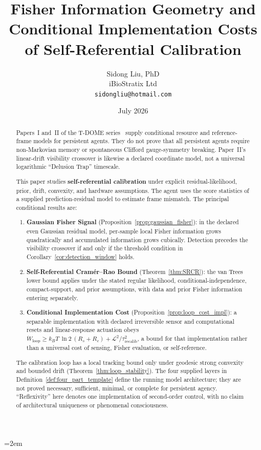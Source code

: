 \documentclass[12pt]{article}
\title{Fisher Information Geometry and Conditional Implementation Costs\\
of Self-Referential Calibration}
\author{Sidong Liu, PhD \\
\small iBioStratix Ltd \\
\small \texttt{sidongliu@hotmail.com}}
\date{July 2026}
\begin{document}
\emergencystretch=2em
\raggedbottom
{}
\maketitle

\begin{abstract}
Papers~I and~II of the T-DOME
series~\cite{Liu2026TDOME_I,Liu2026TDOME_II} supply conditional
resource and reference-frame models for persistent agents.  They do not
prove that all persistent agents require non-Markovian memory or
spontaneous Clifford gauge-symmetry breaking.  Paper~II's linear-drift
visibility crossover is likewise a declared coordinate model, not a
universal logarithmic ``Delusion Trap'' timescale.

This paper studies \textbf{self-referential calibration} under explicit
residual-likelihood, prior, drift, convexity, and hardware assumptions.
The agent uses the score statistics of a supplied prediction-residual
model to estimate frame mismatch.  The principal conditional results are:
\begin{enumerate}
\item \textbf{Gaussian Fisher Signal}
  (Proposition~\ref{prop:gaussian_fisher}):
  in the declared even Gaussian residual model, per-sample local Fisher
  information grows quadratically and accumulated information grows
  cubically.  Detection precedes the visibility crossover if and only if
  the threshold condition in Corollary~\ref{cor:detection_window} holds.
\item \textbf{Self-Referential Cram\'{e}r--Rao Bound}
  (Theorem~\ref{thm:SRCR}):
  the van Trees lower bound applies under the stated regular likelihood,
  conditional-independence, compact-support, and prior assumptions, with
  data and prior Fisher information entering separately.
\item \textbf{Conditional Implementation Cost}
  (Proposition~\ref{prop:loop_cost_impl}):
  a separable implementation with declared irreversible sensor and
  computational resets and linear-response actuation obeys
  $\dot{W}_{\mathrm{loop}}
  \geq k_BT\,\ln 2\,(R_s+R_c)
  + \mathcal{L}^2/\tau_{\mathrm{recalib}}^2$,
  a bound for that implementation rather than a universal cost of
  sensing, Fisher evaluation, or self-reference.
\end{enumerate}

The calibration loop has a local tracking bound only under geodesic
strong convexity and bounded drift (Theorem~\ref{thm:loop_stability}).
The four supplied layers in Definition~\ref{def:four_part_template}
define the running model architecture; they are not proved necessary,
sufficient, minimal, or complete for persistent agency.  ``Reflexivity''
here denotes one implementation of second-order control, with no claim of
architectural uniqueness or phenomenal consciousness.
\end{abstract}
\end{document}
